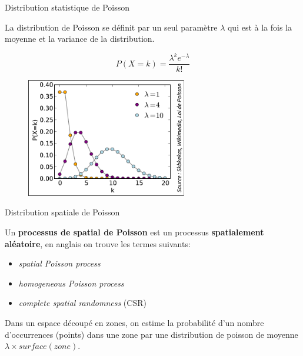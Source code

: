 \begin{frame}{Distribution statistique de Poisson}

La distribution de Poisson se définit par un seul paramètre $\lambda$ qui est à la fois la moyenne et la variance de la distribution.

\begin{equation}
\nonumber
P(X = k) = \frac{\lambda^k e^{-\lambda}}{k!}
\end{equation}


\begin{figure}
  \includegraphics[width=7cm]{Poisson.pdf}
\end{figure}

\end{frame}



\begin{frame}{Distribution spatiale de Poisson}

Un \textbf{processus de spatial de Poisson} est un processus \textbf{spatialement aléatoire}, en anglais on trouve les termes suivants:

\begin{itemize}
  \item \textit{spatial Poisson process}
  \item \textit{homogeneous Poisson process}
  \item \textit{complete spatial randomness} (CSR)
\end{itemize}

Dans un espace découpé en zones, on estime la probabilité d'un nombre d'occurrences (points) dans une zone par une distribution de poisson de moyenne $\lambda \times surface(zone)$.

\end{frame}


